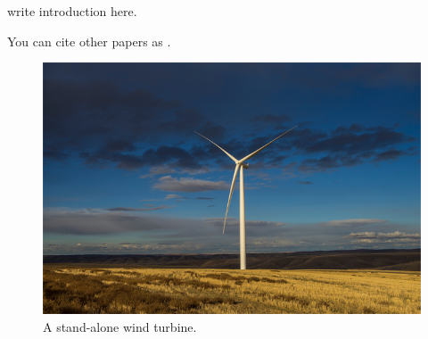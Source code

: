 write introduction here.

You can cite other papers as \cite{Abkar2016a}.

\begin{figure}
\centering
\includegraphics[width=.5\textwidth]{Figures/WindTurbine.png}
\caption{A stand-alone wind turbine.}
\label{fig:fig1}
\end{figure}